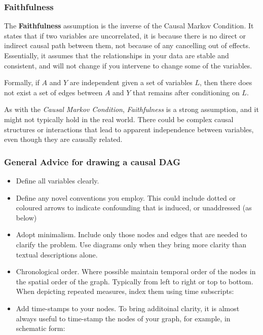 \documentclass[
  singlecolumn]{report}
\providecommand{\tightlist}{%
  \setlength{\itemsep}{0pt}\setlength{\parskip}{0pt}}\usepackage{longtable,booktabs,array}
\begin{document}
\hypertarget{faithfulness}{%
\subsubsection{\texorpdfstring{\textbf{Faithfulness}}{Faithfulness}}\label{faithfulness}}

The \textbf{Faithfulness} assumption is the inverse of the Causal Markov
Condition. It states that if two variables are uncorrelated, it is
because there is no direct or indirect causal path between them, not
because of any cancelling out of effects. Essentially, it assumes that
the relationships in your data are stable and consistent, and will not
change if you intervene to change some of the variables.

Formally, if \(A\) and \(Y\) are independent given a set of variables
\(L\), then there does not exist a set of edges between \(A\) and \(Y\)
that remains after conditioning on \(L\).

As with the \emph{Causal Markov Condition}, \emph{Faithfulness} is a
strong assumption, and it might not typically hold in the real world.
There could be complex causal structures or interactions that lead to
apparent independence between variables, even though they are causally
related.

\hypertarget{general-advice-for-drawing-a-causal-dag}{%
\subsubsection{General Advice for drawing a causal
DAG}\label{general-advice-for-drawing-a-causal-dag}}

\begin{itemize}
\tightlist
\item
  Define all variables clearly.
\item
  Define any novel conventions you employ. This could include dotted or
  coloured arrows to indicate confounding that is induced, or
  unaddressed (as below)
\item
  Adopt minimalism. Include only those nodes and edges that are needed
  to clarify the problem. Use diagrams only when they bring more clarity
  than textual descriptions alone.
\item
  Chronological order. Where possible maintain temporal order of the
  nodes in the spatial order of the graph. Typically from left to right
  or top to bottom. When depicting repeated measures, index them using
  time subscripts:
\item
  Add time-stamps to your nodes. To bring additoinal clarity, it is
  almost always useful to time-stamp the nodes of your graph, for
  example, in schematic form:
\end{itemize}
\end{document}
